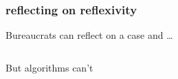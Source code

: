 \documentclass[presentation]{subfiles}
\begin{document}
\begin{frame}\frametitle{reflecting on reflexivity}
Bureaucrats can reflect on a case and \dots

\begin{columns}
\begin{column}{0.3\textwidth}
\end{column}
\begin{column}{0.3\textwidth}
\end{column}
\begin{column}{0.3\textwidth}
\end{column}
\end{columns}

\end{frame}

\begin{frame}[standout]

But algorithms can't
\end{frame}
\end{document}
